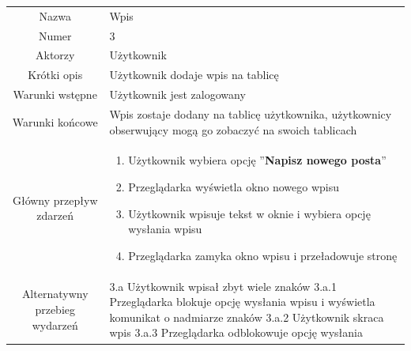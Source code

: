 \documentclass[a4paper]{article}
\begin{document}
\begin{tabular}{c p{10cm}}
Nazwa&	Wpis\\
Numer	& 3\\
Aktorzy &	Użytkownik\\
Krótki opis &  Użytkownik dodaje wpis na tablicę\\
Warunki wstępne& Użytkownik jest zalogowany\\
Warunki końcowe& Wpis zostaje dodany na tablicę użytkownika, użytkownicy obserwujący mogą go zobaczyć na swoich tablicach\\
Główny przepływ zdarzeń&
\begin{enumerate}
\item Użytkownik wybiera opcję ''\textbf{Napisz nowego posta}'' 
\item Przeglądarka wyświetla okno nowego wpisu 
\item Użytkownik wpisuje tekst w oknie i wybiera opcję wysłania wpisu
\item Przeglądarka zamyka okno wpisu i przeładowuje stronę
\end{enumerate} \\

Alternatywny przebieg wydarzeń &
3.a Użytkownik wpisał zbyt wiele znaków \newline
3.a.1 Przeglądarka blokuje opcję wysłania wpisu i wyświetla komunikat o nadmiarze znaków \newline
3.a.2 Użytkownik skraca wpis \newline
3.a.3 Przeglądarka odblokowuje opcję wysłania \newline \\
\hline
\end{tabular}
\newline
\newline
\end{document}
